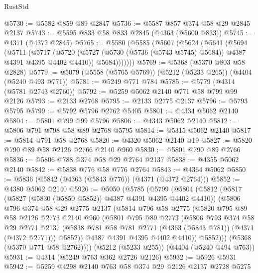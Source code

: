 \begin{lexlean}{RustStd}
\begin{coremodule}
{\begin{coremodule}
{{{{{{{{{{{{{{{{@5730 := @5582 @859 @89 @2847
@5736 := @5587 @857 @374 @58 @29 @2845 @2137
@5743 := @5595 @833 @58 @833 @2845 (@4363 (@5600 @833))
@5745 := @4371 (@4372 @2845)
@5765 := @5580
    (@5585
      (@5607
        (@5624
          (@5641
            (@5694
              (@5711
                (@5717
                  (@5720 (@5727 (@5730 (@5736 (@5743 @5745) @5684)) @4387 @4391 @4395 @4402 @4410))
                  @5684)))))))
@5769 := @5368 (@5370 @803 @58 @2828)
@5779 := @5079 (@5558 (@5765 @5769)) (@5212 (@5233 @265)) (@4404 (@5240 @493 @771))
@5781 := @5249 @771 @784
@5785 := @5779 (@4314 (@5781 @2743 @2760))
@5792 := @5259 @5062 @2140 @771 @58 @799 @99 @2126
@5793 := @2133 @2768
@5795 := @2133 @2775 @2137
@5796 := @5793 @5795
@5799 := @5792 @5796 @2762 @5405
@5801 := @4334 @5062 @2140
@5804 := @5801 @799 @99 @5796
@5806 := @4343 @5062 @2140
@5812 := @5806 @791 @798 @58 @89 @2768 @5795
@5814 := @5315 @5062 @2140
@5817 := @5814 @791 @58 @2768
@5820 := @4320 @5062 @2140 @19
@5827 := @5820 @790 @89 @58 @2126 @2766 @2140 @960
@5830 := @5801 @790 @89 @2766
@5836 := @5806 @788 @374 @58 @29 @2764 @2137
@5838 := @4355 @5062 @2140
@5842 := @5838 @776 @58 @776 @2764
@5843 := @4364 @5062
@5850 := @5836 (@5842 (@4363 (@5843 @776)) (@4371 (@4372 @2764)))
@5852 := @4380 @5062 @2140
@5926 := @5050
    (@5785
      (@5799
        (@5804
          (@5812
            (@5817 (@5827 (@5830 (@5850 @5852)) @4387 @4391 @4395 @4402 @4410))
            (@5806
              @796
              @374
              @58
              @29
              @2775
              @2137
              (@5814
                @796
                @58
                @2775
                (@5820
                  @795
                  @89
                  @58
                  @2126
                  @2773
                  @2140
                  @960
                  (@5801
                    @795
                    @89
                    @2773
                    (@5806
                      @793
                      @374
                      @58
                      @29
                      @2771
                      @2137
                      (@5838 @781 @58 @781 @2771 (@4363 (@5843 @781)) (@4371 (@4372 @2771)))
                      @5852))
                  @4387
                  @4391
                  @4395
                  @4402
                  @4410))
              @5852)))
        (@5368 (@5370 @771 @58 @2762))))
    (@5212 (@5233 @255))
    (@4404 (@5240 @494 @763))
@5931 := @4314 (@5249 @763 @362 @2726 @2126)
@5932 := @5926 @5931
@5942 := @5259 @4298 @2140 @763 @58 @374 @29 @2126 @2137 @2728 @5275
}}}}}}}}}}}}}}}}
\end{coremodule}}
\end{coremodule}
\end{lexlean}
